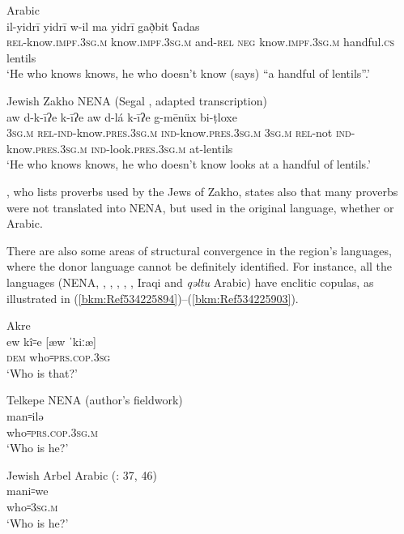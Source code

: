\documentclass[output=paper]{langsci/langscibook}
\begin{document}
\ea\label{bkm:Ref534225045} Arabic \citep[235]{Chyet1995} \\
\gll il-yidrī   yidrī     w-il ma yidrī     gað̣bit ʕadas\\
    \textsc{rel}\textup{{}-know.}\textsc{impf.3sg.m} \textup{know.}\textsc{impf.3sg.m} \textup{and-}\textsc{rel} \textsc{neg} \textup{know.}\textsc{impf.3sg.m} handful\textsc{.cs} lentils\\
\glt ‘He who knows knows, he who doesn’t know (says) “a handful of lentils”.’\z

\ea\label{bkm:Ref534225057}Jewish Zakho NENA (Segal \citeyear[262]{Segal1955}, adapted transcription)\\
\gll aw d-k-īʔe   k-īʔe     aw d-lá k-īʔe   g-mēnüx bi-ṭloxe\\
    \textsc{3sg.m} \textsc{rel}\textup{{}-}\textsc{ind-}\textup{know}\textsc{.pres.3sg.m} \textsc{ind}\textup{{}-know.}\textsc{pres.3sg.m} \textsc{3sg.m} \textsc{rel}\textup{{}-not} \textsc{ind}\textup{{}-know.}\textsc{pres.3sg.m} \textsc{ind-}\textup{look.}\textsc{pres}.\textsc{3sg.m} \textup{at-lentils}\\
\glt ‘He who knows knows, he who doesn’t know looks at a handful of lentils.’\z

\citet{Sabar1978}, who lists proverbs used by the {Jews} of Zakho, states also that many proverbs were not translated into NENA, but used in the original language, whether  or Arabic.

There are also some areas of structural {convergence} in the region’s languages, where the donor language cannot be definitely identified. For instance, all the languages (NENA, , , , , , Iraqi  and \textit{qəltu} Arabic) have enclitic copulas, as illustrated in (\ref{bkm:Ref534225894})–(\ref{bkm:Ref534225903}).

\ea\label{bkm:Ref534225894}Akre  \citep[175]{MacKenzie1961}\\
\gll ew kî꞊e \textup{[æw ˈkiːæ]}\\
     \textsc{dem} who꞊\textsc{prs.cop.3sg}\\
\glt ‘Who is that?’ 
\z

\ea {} Telkepe NENA (author’s fieldwork)\\
\gll man꞊ilə\\
     who꞊\textsc{prs.cop.3sg.m}\\
\glt ‘Who is he?’\z

\ea\label{bkm:Ref534225903}Jewish Arbel Arabic (\citealt{Jastrow1990book}: 37, 46) \\
\gll mani꞊we\\
     who꞊\textsc{3sg.m}\\
\glt ‘Who is he?’\z
\end{document}
